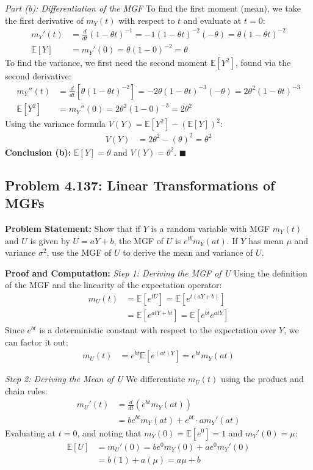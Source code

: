 \documentclass[11pt, a4paper]{article}
\theoremstyle{definition}
\theoremstyle{remark}
\newcommand{\E}{\mathbb{E}}
\begin{document}
\textit{Part (b): Differentiation of the MGF}
To find the first moment (mean), we take the first derivative of $m_Y(t)$ with respect to $t$ and evaluate at $t=0$:
\begin{align*}
m_Y'(t) &= \frac{d}{dt} (1 - \theta t)^{-1} = -1(1 - \theta t)^{-2}(-\theta) = \theta(1 - \theta t)^{-2} \\
\E[Y] &= m_Y'(0) = \theta(1 - 0)^{-2} = \theta
\end{align*}
To find the variance, we first need the second moment $\E[Y^2]$, found via the second derivative:
\begin{align*}
m_Y''(t) &= \frac{d}{dt} \left[ \theta(1 - \theta t)^{-2} \right] = -2\theta(1 - \theta t)^{-3}(-\theta) = 2\theta^2(1 - \theta t)^{-3} \\
\E[Y^2] &= m_Y''(0) = 2\theta^2(1 - 0)^{-3} = 2\theta^2
\end{align*}
Using the variance formula $V(Y) = \E[Y^2] - (\E[Y])^2$:
\begin{align*}
V(Y) &= 2\theta^2 - (\theta)^2 = \theta^2
\end{align*}
\textbf{Conclusion (b):} $\E[Y] = \theta$ and $V(Y) = \theta^2$. $\blacksquare$

\subsection{Problem 4.137: Linear Transformations of MGFs}
\textbf{Problem Statement:} Show that if $Y$ is a random variable with MGF $m_Y(t)$ and $U$ is given by $U = aY + b$, the MGF of $U$ is $e^{tb} m_Y(at)$. If $Y$ has mean $\mu$ and variance $\sigma^2$, use the MGF of $U$ to derive the mean and variance of $U$.

\textbf{Proof and Computation:}
\textit{Step 1: Deriving the MGF of U}
Using the definition of the MGF and the linearity of the expectation operator:
\begin{align*}
m_U(t) &= \E[e^{tU}] = \E[e^{t(aY + b)}] \\
&= \E[e^{atY + bt}] = \E[e^{bt} e^{atY}]
\end{align*}
Since $e^{bt}$ is a deterministic constant with respect to the expectation over $Y$, we can factor it out:
\begin{align*}
m_U(t) &= e^{bt} \E[e^{(at)Y}] = e^{bt} m_Y(at)
\end{align*}

\textit{Step 2: Deriving the Mean of U}
We differentiate $m_U(t)$ using the product and chain rules:
\begin{align*}
m_U'(t) &= \frac{d}{dt} \left( e^{bt} m_Y(at) \right) \\
&= b e^{bt} m_Y(at) + e^{bt} \cdot a m_Y'(at)
\end{align*}
Evaluating at $t=0$, and noting that $m_Y(0) = \E[e^0] = 1$ and $m_Y'(0) = \mu$:
\begin{align*}
\E[U] &= m_U'(0) = b e^{0} m_Y(0) + a e^{0} m_Y'(0) \\
&= b(1) + a(\mu) = a\mu + b
\end{align*}
\end{document}
